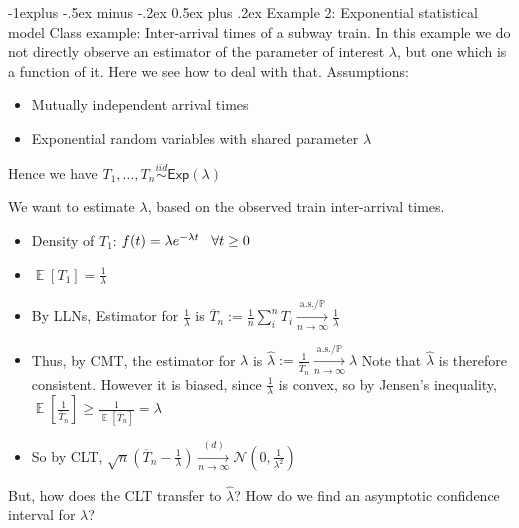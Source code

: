 \documentclass[10pt,landscape]{article}
\makeatletter
\DeclareMathOperator{\E}{\mathbb{E}}
\renewcommand{\subsection}{\@startsection{subsection}{2}{0mm}%
                                {-1explus -.5ex minus -.2ex}%
                                {0.5ex plus .2ex}%
                                {\normalfont\normalsize\bfseries}}
\makeatother
\begin{document}
\begin{multicols*}{3}
\subsection{Example 2: Exponential statistical model}
Class example: Inter-arrival times of a subway train.\newline
In this example we do not directly observe an estimator of the parameter of interest $\lambda$, but one which is a function of it. Here we see how to deal with that.\newline
Assumptions:
\begin{itemize}
\item Mutually independent arrival times 
\item Exponential random variables with shared parameter $\lambda$
\end{itemize}
Hence we have  $T_1,\ldots ,T_ n\stackrel{iid}{\sim } \textsf{Exp}(\lambda)$

We want to estimate $\lambda$, based on the observed train inter-arrival times.
\begin{itemize}
\item Density of $T_1$: $f(t)=\lambda e^{-\lambda t}\hspace{3mm}\forall t\ge 0$
\item $\E[T_1]=\frac{1}{\lambda}$
\item By LLNs, Estimator for $\frac{1}{\lambda}$ is $\overline T_n:=\frac{1}{n}\sum^n_i T_i\xrightarrow[n\to\infty]{\text{a.s.}/\mathbb{P}}\frac{1}{\lambda}$
\item Thus, by CMT, the estimator for $\lambda$ is $\hat\lambda:=\frac{1}{\overline T_n}\xrightarrow[n\to\infty]{\text{a.s.}/\mathbb{P}}\lambda$
Note that $\hat\lambda$ is therefore consistent. However it is biased, since $\frac{1}{\lambda}$ is convex, so by Jensen's inequality, $\E\left[\frac{1}{\overline T_n}\right]\ge\frac{1}{\E[\overline T_n]}=\lambda$
\item So by CLT, $\sqrt{n}\left(\overline T_n-\frac{1}{\lambda}\right)\xrightarrow[n\to\infty]{(d)}\mathcal{N}\left(0,\frac{1}{\lambda^2}\right)$
\end{itemize}

But, how does the CLT transfer to $\hat\lambda$? How do we find an asymptotic confidence interval for $\lambda$?


\end{multicols*}
\end{document}
